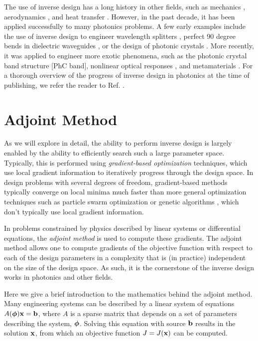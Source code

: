 The use of inverse design has a long history in other fields, such as mechanics \cite{tanaka_inverse_1998}, aerodynamics \cite{jameson_aerodynamic_nodate}, and heat transfer \cite{ozisik_inverse_2018}.
However, in the past decade, it has been applied successfully to many photonics problems.
A few early examples include the use of inverse design to engineer wavelength splitters \cite{piggott_inverse_2015,kingma_adam:_2014}, perfect 90 degree bends in dielectric waveguides \cite{jensen_topology_2005}, or the design of photonic crystals \cite{borel_topology_2004}.
More recently, it was applied to engineer more exotic phenomena, such as the photonic crystal band structure [PhC band], nonlinear optical responses \cite{lin_cavity-enhanced_2016}, and metamaterials \cite{sigmund_systematic_2009}.
For a thorough overview of the progress of inverse design in photonics at the time of publishing, we refer the reader to Ref. .

\section{Adjoint Method}

As we will explore in detail, the ability to perform inverse design is largely enabled by the ability to efficiently search such a large parameter space.
Typically, this is performed using \textit{gradient-based optimization} techniques, which use local gradient information to iteratively progress through the design space.
In design problems with several degrees of freedom, gradient-based methods typically converge on local minima much faster than more general optimization techniques such as particle swarm optimization \cite{noauthor_particle_nodate} or genetic algorithms \cite{whitley_genetic_1994}, which don't typically use local gradient information.

In problems constrained by physics described by linear systems or differential equations, the \textit{adjoint method} is used to compute these gradients.
The adjoint method allows one to compute gradients of the objective function with respect to each of the design parameters in a complexity that is (in practice) independent on the size of the design space.
As such, it is the cornerstone of the inverse design works in photonics and other fields.

Here we give a brief introduction to the mathematics behind the adjoint method.
Many engineering systems can be described by a linear system of equations $A(\bm{\phi}) \mathbf{x} = \mathbf{b}$, where $A$ is a sparse matrix that depends on a set of parameters describing the system, $\bm{\phi}$.
Solving this equation with source $\mathbf{b}$ results in the solution $\mathbf{x}$, from which an objective function $J=J(\mathbf{x})$ can be computed.

